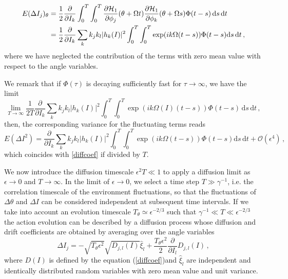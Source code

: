 \begin{equation}
    \begin{aligned}
    E(\Delta I_j)_\theta&=\frac{1}{2}\frac{\partial}{\partial I_k}\int_0^T\int_0^T
     \frac{\partial \mathcal{H}_1}{\partial \phi_j}(\theta+\Omega t)\frac{\partial \mathcal{H}_1}{\partial \phi_k}(\theta+\Omega s)\Phi(t-s)\, \mathrm{d}s\,\mathrm{d}t \\
    &=
    \frac{1}{2} \frac{\partial}{\partial I_k}\sum_k k_jk_l |h_k(I)|^2
    \int_0^T\int_0^T \exp(ik\Omega (t-s))\Phi(t-s) \mathrm{d}s\,\mathrm{d}t\,,
    \end{aligned}
\end{equation}
where we have neglected the contribution of the terms with zero mean value with respect to the angle variables. 

We remark that if $\Phi(\tau)$ is decaying sufficiently fast for $\tau\to\infty$, we have the limit
\begin{equation}
    \lim_{T\to \infty} \frac{1}{2T} \frac{\partial}{\partial I_k}\sum_k k_jk_l |h_k(I)|^2\int_0^T\int_0^T \exp(ik\Omega(I) (t-s))\Phi(t-s) \,\mathrm{d}s\,\mathrm{d}t \,,
\end{equation}
then, the corresponding variance for the fluctuating terms reads
\begin{equation}
    E(\Delta I^2)=\frac{\partial}{\partial I_k}\sum_k k_jk_l |h_k(I)|^2
    \int_0^T\int_0^T \exp(ik\Omega (t-s))\Phi(t-s) \mathrm{d}s\,\mathrm{d}t+\mathcal{O}(\epsilon^4)\,,
\end{equation}
which coincides with \eqref{diffcoef} if divided by $T$.

We now introduce the diffusion timescale $\epsilon^2 T\ll 1$ to apply a diffusion limit as $\epsilon \to 0$ and $T\to \infty$. In the limit of $\epsilon \to 0$, we select a time step $T\gg \gamma^{-1}$, i.e. the correlation timescale of the environment fluctuations, so that the fluctuations of $\Delta \theta$ and $\Delta I$ can be considered independent at subsequent time intervals. If we take into account an evolution timescale $T_\theta\simeq \epsilon^{-2/3}$ such that $\gamma^{-1}\ll T\ll \epsilon^{-2/3}$ the action evolution can be described by a diffusion process whose diffusion and drift coefficients are obtained by averaging over the angle variables
\begin{equation}
    \Delta I_j=-\sqrt{T_\theta \epsilon^2}\sqrt{D_{j,l}(I)}\hat \xi_l+
    \frac{T_\theta\epsilon^2}{2} \frac{\partial}{\partial I_l}D_{j,l}(I) \,,
    \label{stocproc}
\end{equation}
where $D(I)$ is defined by the equation (\ref{diffcoef})and $\hat \xi_l$ are independent and identically distributed random variables with zero mean value and unit variance.

